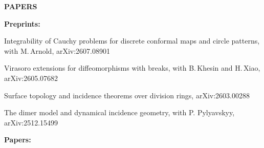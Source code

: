\documentclass[a4paper, 12pt]{article}
\begin{document}
\textbf{PAPERS} \par\smallskip
 \textbf{Preprints:}
 \begin{compactenum}
 
 \item Integrability of Cauchy problems for discrete conformal maps and circle patterns, with M.\,Arnold, arXiv:2607.08901
 
 \item Virasoro extensions for diffeomorphisms with breaks, with  B.\,Khesin and H.\,Xiao, 
 	arXiv:2605.07682


\item Surface topology and incidence theorems over division rings, arXiv:2603.00288

\item The dimer model and dynamical incidence geometry, with P. Pylyavskyy, arXiv:2512.15499


\end{compactenum}
 \par\smallskip
 \textbf{Papers:}
\end{document}
